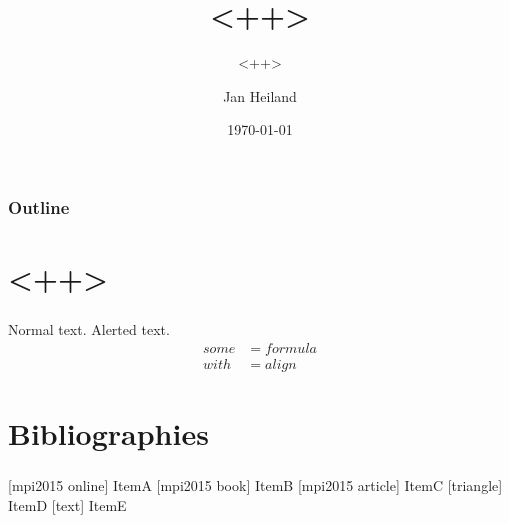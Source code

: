 \documentclass[%
aspectratio=43 %
,table %
]{beamer}
\title[<++>]{<++>}
\subtitle{<++>}
\author[Jan Heiland]{Jan Heiland}
\institute{CSC}
\date{\today}
\begin{document}
\maketitle %

\begin{frame}
    \frametitle{Outline}
    \tableofcontents
\end{frame}

\section{<++>} 
\begin{frame}
 \frametitle{\secname}
  Normal text.  \alert{Alerted text.}
  \begin{align*}
    s o m e &= f o r m u l a\\
     w i t h &=   a l i g n
  \end{align*}
\end{frame}

\section{Bibliographies}
\begin{frame}
  \frametitle{\secname}
  \begin{thebibliography}{9}
    [mpi2015 online]
   ItemA
    [mpi2015 book]
   ItemB
    [mpi2015 article]
   ItemC
    [triangle]
   ItemD
    [text]
   ItemE
  \end{thebibliography}
\end{frame}
\end{document}
